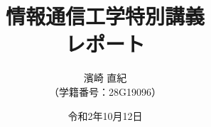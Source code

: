 \documentclass[11pt,a4paper]{jsarticle}
\title{\Huge 情報通信工学特別講義\\\huge レポート\vspace{109mm}}
\author{\Large 濱崎 直紀\\\large （学籍番号：28G19096）\vspace{23mm}}
\date{令和2年10月12日}
\begin{document}
\begin{titlepage}
\maketitle
\thispagestyle{empty}
\end{titlepage}

\pagestyle{empty}



\end{document}
